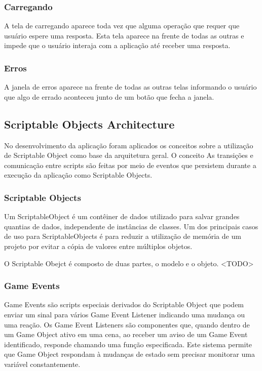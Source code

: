 \subsubsection{Carregando}
\label{subsubsec:carregando}

A tela de carregando aparece toda vez que alguma operação que requer que usuário espere uma resposta. Esta tela aparece na frente de todas as outras e impede que o usuário interaja com a aplicação até receber uma resposta.


\subsubsection{Erros}
\label{subsubsec:erros}

A janela de erros aparece na frente de todas as outras telas informando o usuário que algo de errado aconteceu junto de um botão que fecha a janela.

\subsection{Scriptable Objects Architecture}
\label{subsec:scriptableobjectsarch}

No desenvolvimento da aplicação foram aplicados os conceitos sobre a utilização de Scriptable Object como base da arquitetura geral. O conceito
As transições e comunicação entre scripts são feitas por meio de eventos que persistem durante a execução da aplicação como Scriptable Objects.

\subsubsection{Scriptable Objects}
\label{subsubsec:scriptableobjects}

Um ScriptableObject é um contêiner de dados utilizado para salvar grandes quantias de dados, independente de instâncias de classes. Um dos principais casos de uso para ScriptableObjects é para reduzir a utilização de memória de um projeto por evitar a cópia de valores entre múltiplos objetos.\cite{scriptableobject}

O Scriptable Obejct é composto de duas partes, o modelo e o objeto. <TODO>

\subsubsection{Game Events}
\label{subsubsec:gameevents}

Game Events são scripts especiais derivados do Scriptable Object que podem enviar um sinal para vários Game Event Listener indicando uma mudança ou uma reação. Os Game Event Listeners são componentes que, quando dentro de um Game Object ativo em uma cena, ao receber um aviso de um Game Event identificado, responde chamando uma função especificada. Este sistema permite que Game Object respondam à mudanças de estado sem precisar monitorar uma variável constantemente.\cite{scriptableobjectarchitecture}

